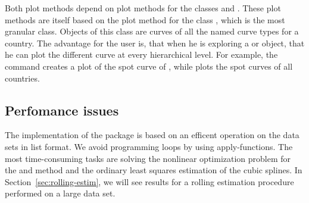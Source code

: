 Both plot methods depend on plot methods for the classes  and . These plot methods are itself based on the plot method for the class , which is the most granular class. Objects of this class are curves of all the named curve types for a country. The advantage for the user is, that when he
is exploring a  or  object, that he can plot the different curve at every hierarchical level. 
For example, the command  creates a plot of the spot curve of , while  plots the spot curves of all countries. 


\subsection{Perfomance issues}
\label{sec:perfomance-issues}

The implementation of the  package is based on an efficent operation on the data sets in list format. We avoid programming loops by using apply-functions. The most time-consuming tasks are solving the nonlinear optimization problem for the \cite{Nelson1987} and \cite{Svensson1994} method and the ordinary least squares estimation of the \cite{McCulloch1975} cubic splines. In Section~\ref{sec:rolling-estim}, we will see results for a rolling estimation procedure performed on a large data set.


